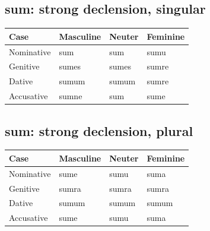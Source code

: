 \subsection*{sum: strong declension, singular}

\par\begingroup
\fontsize{10.5}{13.2}\selectfont
\setlength{\LTleft}{0pt}\setlength{\LTright}{\fill}
\noindent
\begin{tabular}{@{}>{\raggedright\arraybackslash}p{28.89mm}>{\raggedright\arraybackslash}p{28.89mm}>{\raggedright\arraybackslash}p{28.89mm}>{\raggedright\arraybackslash}p{28.89mm}@{}}
\toprule
\textbf{Case} & \textbf{Masculine} & \textbf{Neuter} & \textbf{Feminine} \\
\midrule
Nominative & sum & sum & sumu \\
Genitive & sumes & sumes & sumre \\
Dative & sumum & sumum & sumre \\
Accusative & sumne & sum & sume \\
\bottomrule
\end{tabular}
\par\endgroup

\subsection*{sum: strong declension, plural}

\par\begingroup
\fontsize{10.5}{13.2}\selectfont
\setlength{\LTleft}{0pt}\setlength{\LTright}{\fill}
\noindent
\begin{tabular}{@{}>{\raggedright\arraybackslash}p{28.89mm}>{\raggedright\arraybackslash}p{28.89mm}>{\raggedright\arraybackslash}p{28.89mm}>{\raggedright\arraybackslash}p{28.89mm}@{}}
\toprule
\textbf{Case} & \textbf{Masculine} & \textbf{Neuter} & \textbf{Feminine} \\
\midrule
Nominative & sume & sumu & suma \\
Genitive & sumra & sumra & sumra \\
Dative & sumum & sumum & sumum \\
Accusative & sume & sumu & suma \\
\bottomrule
\end{tabular}
\par\endgroup

